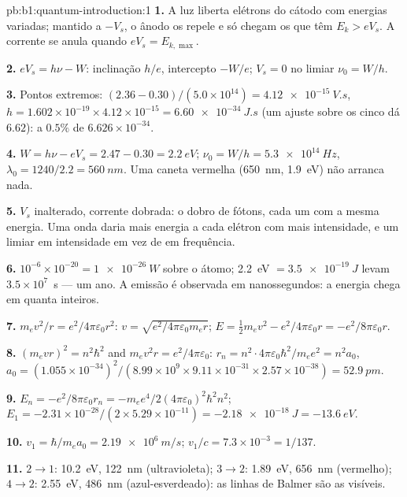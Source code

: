 \begin{solution}{pb:b1:quantum-introduction:1}
\textbf{1.} A luz liberta elétrons do cátodo com energias
variadas; mantido a $-V_s$, o ânodo os repele e só chegam os que têm
$E_k > eV_s$. A corrente se anula quando $eV_s = E_{k,\max}$.

\textbf{2.} $eV_s = h\nu - W$: inclinação $h/e$, intercepto $-W/e$; $V_s = 0$ no
limiar $\nu_0 = W/h$.

\textbf{3.} Pontos extremos: $(2.36 - 0.30)/(5.0 \times 10^{14}) = \qty{4.12e-15}{V.s}$,
$h = 1.602 \times 10^{-19} \times 4.12 \times 10^{-15} = \qty{6.60e-34}{J.s}$ (um ajuste sobre
os cinco dá $6.62$): a $0.5\%$ de $6.626 \times 10^{-34}$.

\textbf{4.} $W = h\nu - eV_s = 2.47 - 0.30 = \qty{2.2}{eV}$; $\nu_0 = W/h =
\qty{5.3e14}{Hz}$, $\lambda_0 = 1240/2.2 = \qty{560}{nm}$. Uma caneta vermelha
(\qty{650}{nm}, \qty{1.9}{eV}) não arranca nada.

\textbf{5.} $V_s$ inalterado, corrente dobrada: o dobro de fótons, cada um com
a mesma energia. Uma onda daria mais energia a cada elétron com mais
intensidade, e um limiar em intensidade em vez de em frequência.

\textbf{6.} $10^{-6} \times 10^{-20} = \qty{1e-26}{W}$ sobre o átomo; \qty{2.2}{eV} $=
\qty{3.5e-19}{J}$ levam $3.5 \times 10^7$~s --- um ano. A emissão é observada
em nanossegundos: a energia chega em quanta inteiros.

\textbf{7.} $m_ev^2/r = e^2/4\pi\varepsilon_0r^2$: $v = \sqrt{e^2/4\pi\varepsilon_0m_er}$; $E =
\tfrac12m_ev^2 - e^2/4\pi\varepsilon_0r = -e^2/8\pi\varepsilon_0r$.

\textbf{8.} $(m_evr)^2 = n^2\hbar^2$ and $m_ev^2r = e^2/4\pi\varepsilon_0$: $r_n = n^2 \cdot
4\pi\varepsilon_0\hbar^2/m_ee^2 = n^2a_0$, $a_0 = (1.055 \times 10^{-34})^2/(8.99 \times 10^9
\times 9.11 \times 10^{-31} \times 2.57 \times 10^{-38}) = \qty{52.9}{pm}$.

\textbf{9.} $E_n = -e^2/8\pi\varepsilon_0r_n = -m_ee^4/2(4\pi\varepsilon_0)^2\hbar^2n^2$; $E_1 =
-2.31 \times 10^{-28}/(2 \times 5.29 \times 10^{-11}) = \qty{-2.18e-18}{J} = \qty{-13.6}{eV}$.

\textbf{10.} $v_1 = \hbar/m_ea_0 = \qty{2.19e6}{m/s}$; $v_1/c = 7.3 \times 10^{-3} =
1/137$.

\textbf{11.} $2 \to 1$: \qty{10.2}{eV}, \qty{122}{nm} (ultravioleta); $3 \to 2$:
\qty{1.89}{eV}, \qty{656}{nm} (vermelho); $4 \to 2$: \qty{2.55}{eV}, \qty{486}{nm}
(azul-esverdeado): as linhas de Balmer são as visíveis.


\end{solution}
